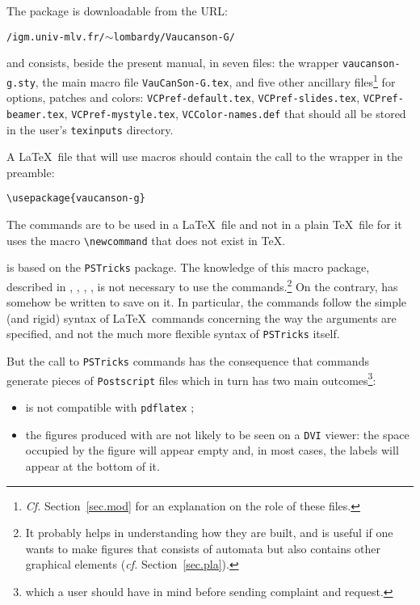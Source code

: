 \documentclass[11pt,twoside]{article}
\newcommand{\PSTricks}{\texttt{PSTricks}\xspace}
\newcommand{\URLtilde}{${\scriptstyle\pmb{\sim}}$}
\begin{document}
The \VCSG package is downloadable from the URL:

\texttt{/igm.univ-mlv.fr/\URLtilde lombardy/Vaucanson-G/}

\noindent
and consists, beside the present manual, in seven files:
the wrapper \texttt{vaucanson-g.sty}, 
the main macro file \texttt{VauCanSon-G.tex}, 
and five other ancillary files\footnote{%
   {\it Cf.} Section~\ref{sec.mod} for an explanation on the role of 
   these files.}
for options, patches and colors:
\texttt{VCPref-default.tex}, 
\texttt{VCPref-slides.tex},
\texttt{VCPref-beamer.tex},
\texttt{VCPref-mystyle.tex},
\texttt{VCColor-names.def}
%
%
%
%
%
that should all be stored in the user's \texttt{texinputs} directory.

A \LaTeX\ file that will use \VCSG macros should contain the call to 
the wrapper in the preamble:

\verb+\usepackage{vaucanson-g}+ 

The \VCSG commands are to be used in a \LaTeX\ file and not in a plain \TeX\ 
file for it uses the macro \verb+\newcommand+ that does not exist in \TeX.

\VCSG is based on the \PSTricks package.
The knowledge of this macro package,
described in \cite{Girou94}, \cite[Ch.~4]{GRM97}, 
\cite{GRMRV07}, \cite{Voss07},
is not necessary to use the \VCSG commands.\footnote{%
   It probably helps in understanding how they are built, and is 
   useful if one wants to make figures that consists of automata but 
   also contains other graphical elements
   ({\it cf.} Section~\ref{sec.pla}).}
On the contrary, \VCSG has somehow be written to save on it.
In particular, the \VCSG commands follow the simple (and rigid) 
syntax of \LaTeX\ commands concerning the way the arguments are 
specified, and not the much more flexible syntax of \PSTricks itself.


But the call to \PSTricks commands has the consequence that \VCSG 
commands generate pieces of \texttt{Postscript} files which in turn 
has two main outcomes\footnote{%
    which a user should have in mind before sending complaint and 
    request.}:
    \begin{itemize}
        \item  \VCSG is not compatible with \verb+pdflatex+ ;
    
        \item  the figures produced with \VCSG are not likely to be 
        seen on a \texttt{DVI} viewer: the space occupied by the figure 
        will appear empty and, in most cases, the labels will appear 
        at the bottom of it.
    \end{itemize}
\end{document}
